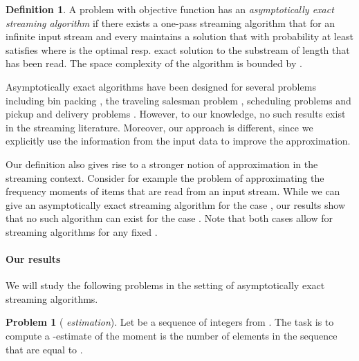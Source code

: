 \documentclass[a4paper,11pt,oneside,english,onecolumn]{article}
\theoremstyle{definition}
\newtheorem{definition}[theorem]{Definition}
\newtheorem{problem}{Problem}
\begin{document}
\begin{definition}
A problem  with objective function  has an \emph{asymptotically exact streaming algorithm} if there exists a one-pass streaming algorithm that for an infinite input stream  and every  maintains a solution  that with probability at least  satisfies  where  is the optimal resp. exact solution to the substream of length  that has been read. The space complexity of the algorithm is bounded by .
\end{definition}
Asymptotically exact algorithms have been designed for several problems including bin packing \cite{BinPacking}, the traveling salesman problem \cite{TSP}, scheduling problems \cite{Scheduling} and pickup and delivery problems \cite{PDP}. However, to our knowledge, no such results exist in the streaming literature. Moreover, our approach is different, since we explicitly use the information from the input data to improve the approximation.

Our definition also gives rise to a stronger notion of approximation in the streaming context. Consider for example the problem of approximating the  frequency moments  of items that are read from an input stream. While we can give an asymptotically exact streaming algorithm for the case , our results show that no such algorithm can exist for the case . Note that both cases allow for  streaming algorithms for any fixed  \cite{ApproxFreqMom,Bar-YossefJKST02}.

\paragraph*{Our results}

We will study the following problems in the setting of asymptotically exact streaming algorithms.

\begin{problem}[\emph{ estimation}] Let  be a sequence of  integers from . The task is to compute a -estimate of the  moment 
is the number of elements in the sequence that are equal to .
\end{problem}
\end{document}
